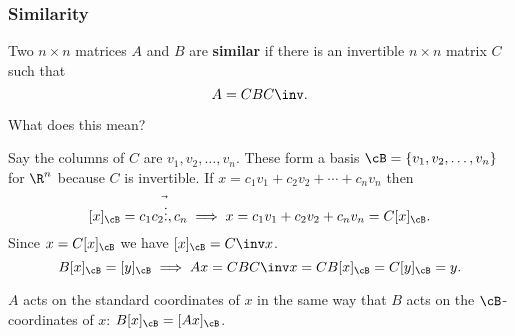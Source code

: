 \begin{frame}
\frametitle{Similarity}

\vskip-3mm
\begin{defn}
  Two $n\times n$ matrices $A$ and $B$ are \textbf{similar} if there is an
  invertible $n\times n$ matrix $C$ such that
  \[ A = CBC\inv. \]
\end{defn}

\pause
\alert{What does this mean?}
\begin{webonly}
Say the columns of $C$ are $v_1,v_2,\ldots,v_n$.
These form a basis $\cB = \{v_1,v_2,\ldots,v_n\}$ for $\R^n$ because $C$ is invertible.
If $x = c_1v_1 + c_2v_2 + \cdots + c_nv_n$ then 
\displayskips{5pt}
\[ [x]_\cB = 
\vec{c_1 c_2 \vdots, c_n}
\implies x = c_1v_1 + c_2v_2 + c_nv_n
= C[x]_\cB. \]
Since $x = C[x]_\cB$ we have $[x]_\cB = C\inv x$.
\[ B[x]_\cB = [y]_\cB \implies Ax = CBC\inv x = CB[x]_\cB = C[y]_\cB = y. \]
\end{webonly}

\pause
\begin{bluebox}{.8\linewidth}
  $A$ acts on the standard coordinates of $x$ in the same way that $B$ acts
  on the $\cB$-coordinates of $x$: $B[x]_\cB = [Ax]_\cB$.
\end{bluebox}

\end{frame}



